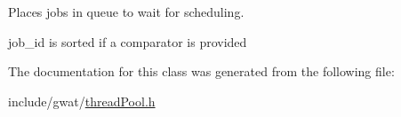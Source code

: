Places jobs in queue to wait for scheduling. 

job\+\_\+id is sorted if a comparator is provided 

The documentation for this class was generated from the following file\+:\begin{DoxyCompactItemize}
\item 
include/gwat/\hyperlink{threadPool_8h}{thread\+Pool.\+h}\end{DoxyCompactItemize}

